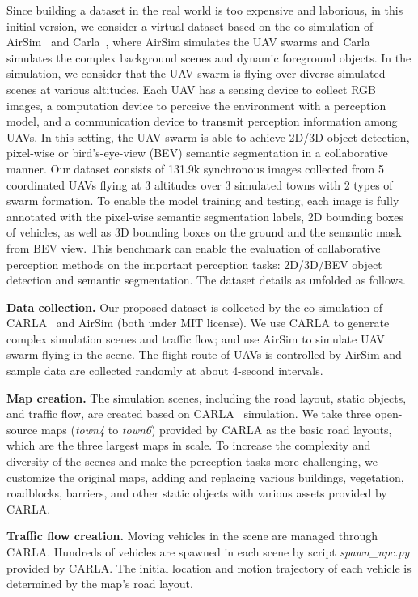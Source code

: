 Since building a dataset in the real world is too expensive and laborious, in this initial version,  we consider a virtual dataset based on the co-simulation of AirSim~\cite{Airsim} and Carla~\cite{carla}, where AirSim simulates the UAV swarms and Carla simulates the complex background scenes and dynamic foreground objects. In the simulation, we consider that the UAV swarm is flying over diverse simulated scenes at various altitudes. Each UAV has a sensing device to collect RGB images, a computation device to perceive the environment with a perception model, and a communication device to transmit perception information among UAVs. In this setting, the UAV swarm is able to achieve 2D/3D object detection, pixel-wise or bird's-eye-view (BEV) semantic segmentation in a collaborative manner. Our dataset consists of 131.9k synchronous images collected from 5 coordinated UAVs flying at 3 altitudes over 3 simulated towns with 2 types of swarm formation. To enable the model training and testing, each image is fully annotated with the pixel-wise semantic segmentation labels, 2D bounding boxes of vehicles, as well as 3D bounding boxes on the ground and the semantic mask from BEV view. This benchmark can enable the evaluation of collaborative perception methods on the important perception tasks: 2D/3D/BEV object detection and semantic segmentation. The dataset details as unfolded as follows.

\textbf{Data collection.} Our proposed dataset is collected by the co-simulation of CARLA~\cite{carla} and AirSim\cite{Airsim} (both under MIT license). We use CARLA to generate complex simulation scenes and traffic flow; and use AirSim to simulate UAV swarm flying in the scene. The flight route of UAVs is controlled by AirSim and sample data are collected randomly at about 4-second intervals.

\textbf{Map creation.} The simulation scenes, including the road layout, static objects, and traffic flow, are created based on CARLA~\cite{carla} simulation. We take three open-source maps (\emph{town4} to \emph{town6}) provided by CARLA as the basic road layouts, which are the three largest maps in scale. To increase the complexity and diversity of the scenes and make the perception tasks more challenging, we customize the original maps, adding and replacing various buildings, vegetation, roadblocks, barriers, and other static objects with various assets provided by CARLA.

\textbf{Traffic flow creation.} Moving vehicles in the scene are managed through CARLA. Hundreds of vehicles are spawned in each scene by script \emph{spawn\_npc.py} provided by CARLA. The initial location and motion trajectory of each vehicle is determined by the map's road layout.

